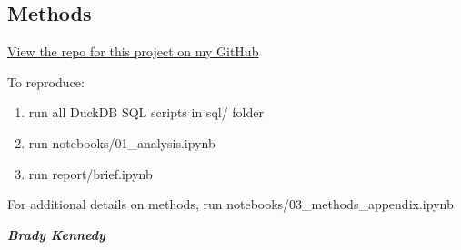 \documentclass[
  letterpaper,
  DIV=11,
  numbers=noendperiod]{scrartcl}
\begin{document}
\subsection{Methods}\label{methods}

\href{https://github.com/bmdknndy/HomeOwnershipClimatePolicySupport}{View
the repo for this project on my GitHub}

To reproduce:

\begin{enumerate}
\def\labelenumi{\arabic{enumi}.}
\item
  run all DuckDB SQL scripts in sql/ folder
\item
  run notebooks/01\_analysis.ipynb
\item
  run report/brief.ipynb
\end{enumerate}

For additional details on methods, run
notebooks/03\_methods\_appendix.ipynb

\textbf{\emph{Brady Kennedy}}
\end{document}
